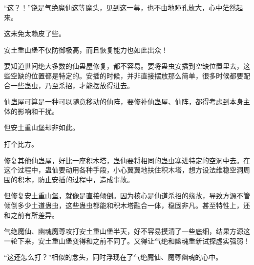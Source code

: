 \begin{this_body}
“这？！”饶是气绝魔仙这等魔头，见到这一幕，也不由地瞳孔放大，心中茫然起来。

这未免太赖皮了些。

安土重山堡不仅防御极高，而且恢复能力也如此出众！

要知道世间绝大多数的仙蛊屋修复，都不容易。要将蛊虫安插到空缺位置里去，这些空缺的位置都是特定的。安插的时候，并非直接摆放那么简单，很多时候都要配合一些蛊虫，乃至杀招，才能摆放得进去。

仙蛊屋可算是一种可以随意移动的仙阵，要修补仙蛊屋、仙阵，都得考虑到本身主体的影响和干扰。

但安土重山堡却非如此。

打个比方。

修复其他仙蛊屋，好比一座积木塔，蛊仙要将相同的蛊虫塞进特定的空洞中去。在这个过程中，蛊仙要动用各种手段，小心翼翼地扶住积木塔，想方设法维稳空洞周围的积木，防止安插的过程中，造成事故。

但修复安土重山堡，就像是直接倾倒。因为核心是仙道杀招的缘故，导致方源不管倾倒多少土道蛊虫，这些蛊虫都能和积木塔融合一体，稳固非凡。甚至特性上，还和之前有所差异。

气绝魔仙、幽魂魔尊攻打安土重山堡半天，好不容易摸清了一些底细，结果方源这一轮下来，安土重山堡变得和之前不同了。又得让气绝和幽魂重新试探虚实强弱！

“这还怎么打？”相似的念头，同时浮现在了气绝魔仙、魔尊幽魂的心中。

\end{this_body}

